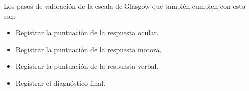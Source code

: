 \begin{itemize}
Los pasos de valoración de la escala de Glasgow que también cumplen con esto son:
\begin{itemize}
    \item Registrar la puntuación de la respuesta ocular.
    \item Registrar la puntuación de la respuesta motora.
    \item Registrar la puntuación de la  respuesta verbal.
    \item Registrar el diagnóstico final.
\end{itemize}


\end{itemize}
